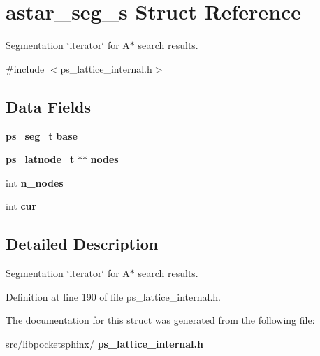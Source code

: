 \section{astar\+\_\+seg\+\_\+s Struct Reference}
\label{structastar__seg__s}


Segmentation \char`\"{}iterator\char`\"{} for A$\ast$ search results.  




{\ttfamily \#include $<$ps\+\_\+lattice\+\_\+internal.\+h$>$}

\subsection*{Data Fields}
\begin{DoxyCompactItemize}
\item 
\mbox{\label{structastar__seg__s_a1703209b29e19fb37ba2a96e0afd4ea2}} 
\textbf{ ps\+\_\+seg\+\_\+t} {\bfseries base}
\item 
\mbox{\label{structastar__seg__s_afaef510ccfb44366e753f1213beb0141}} 
\textbf{ ps\+\_\+latnode\+\_\+t} $\ast$$\ast$ {\bfseries nodes}
\item 
\mbox{\label{structastar__seg__s_af110ca07eba368ea1cdb098612fe0137}} 
int {\bfseries n\+\_\+nodes}
\item 
\mbox{\label{structastar__seg__s_ac61107dec9190e1a22bbe13ba5d1601c}} 
int {\bfseries cur}
\end{DoxyCompactItemize}


\subsection{Detailed Description}
Segmentation \char`\"{}iterator\char`\"{} for A$\ast$ search results. 

Definition at line 190 of file ps\+\_\+lattice\+\_\+internal.\+h.



The documentation for this struct was generated from the following file\+:\begin{DoxyCompactItemize}
\item 
src/libpocketsphinx/\textbf{ ps\+\_\+lattice\+\_\+internal.\+h}\end{DoxyCompactItemize}
